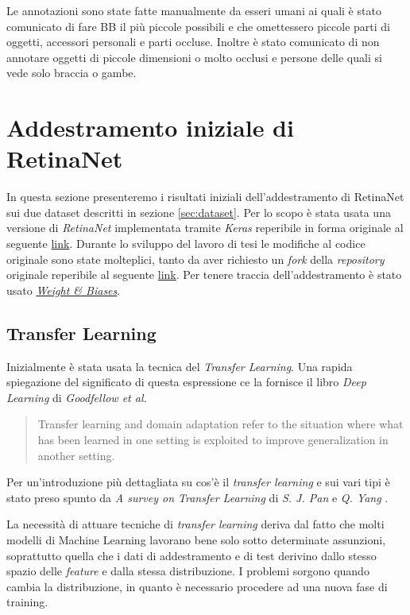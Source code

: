 Le annotazioni sono state fatte manualmente da esseri umani ai quali è stato comunicato di fare \ac{BB} il più piccole possibili e che omettessero piccole parti di oggetti, accessori personali e parti occluse. Inoltre è stato comunicato di non annotare oggetti di piccole dimensioni o molto occlusi e persone delle quali si vede solo braccia o gambe.

\section{Addestramento iniziale di RetinaNet}
\label{sec:addestramento_iniziale_di_retinanet}
In questa sezione presenteremo i risultati iniziali dell'addestramento di RetinaNet sui due dataset descritti in sezione \ref{sec:dataset}. Per lo scopo è stata usata una versione di \textit{RetinaNet} implementata tramite \textit{Keras} reperibile in forma originale al seguente \href{https://github.com/fizyr/keras-retinanet}{link}. Durante lo sviluppo del lavoro di tesi le modifiche al codice originale sono state molteplici, tanto da aver richiesto un \textit{fork} della \textit{repository} originale reperibile al seguente \href{https://github.com/iskorini/keras-retinanet}{link}. Per tenere traccia dell'addestramento è stato usato \href{https://www.wandb.com}{\textit{Weight \& Biases}}.

\subsection{Transfer Learning}
\label{subsec:transfer_learning}
Inizialmente è stata usata la tecnica del \textit{Transfer Learning}. Una rapida spiegazione del significato di questa espressione ce la fornisce il libro \textit{Deep Learning} di \textit{Goodfellow et al.} \cite{Goodfellow-et-al-2016}
\begin{quote}
    Transfer learning and domain adaptation refer to the situation where what has been learned in one setting is exploited to improve generalization in another setting.
\end{quote}
Per un'introduzione più dettagliata su cos'è il \textit{transfer learning} e sui vari tipi è stato preso spunto da \textit{A survey on Transfer Learning} di \textit{S. J. Pan} e \textit{Q. Yang} \cite{5288526}. 

La necessità di attuare tecniche di \textit{transfer learning} deriva dal fatto che molti modelli di Machine Learning lavorano bene solo sotto determinate assunzioni, soprattutto quella che i dati di addestramento e di test derivino dallo stesso spazio delle \textit{feature} e dalla stessa distribuzione. I problemi sorgono quando cambia la distribuzione, in quanto è necessario procedere ad una nuova fase di training. 

